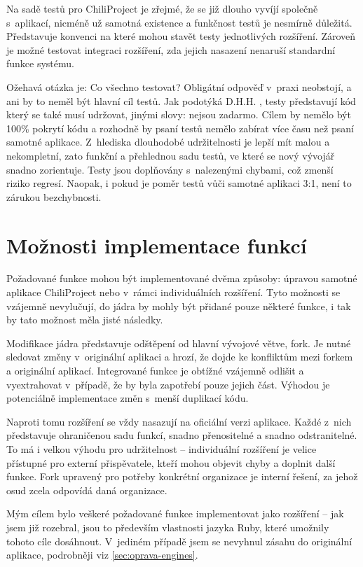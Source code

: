\documentclass[thesis=B,czech]{FITthesis}[2012/05/02]
\begin{document}
Na sadě testů pro ChiliProject je zřejmé, že se již dlouho vyvíjí
společně s~aplikací, nicméně už samotná existence a funkčnost testů je
nesmírně důležitá. Představuje konvenci na které mohou stavět testy
jednotlivých rozšíření. Zároveň je možné testovat integraci rozšíření,
zda jejich nasazení nenaruší standardní funkce systému.

Ožehavá otázka je: Co všechno testovat? Obligátní odpověď 
v~praxi neobstojí, a ani by to neměl být hlavní cíl testů. Jak podotýká
D.H.H. \citep{HanssonTestingTSA}, testy představují kód který se
také musí udržovat, jinými slovy: nejsou zadarmo. Cílem by nemělo být
100\% pokrytí kódu a rozhodně by psaní testů nemělo zabírat více času
než psaní samotné aplikace. Z~hlediska dlouhodobé udržitelnosti je lepší
mít malou a nekompletní, zato funkční a přehlednou sadu testů, ve které
se nový vývojář snadno zorientuje. Testy jsou doplňovány s~nalezenými
chybami, což zmenší riziko regresí. Naopak, i pokud je poměr testů vůči
samotné aplikaci 3:1, není to zárukou bezchybnosti.

\section{Možnosti implementace funkcí}

Požadované funkce mohou být implementované dvěma způsoby: úpravou
samotné aplikace ChiliProject nebo v~rámci individuálních rozšíření.
Tyto možnosti se vzájemně nevylučují, do jádra by mohly být přidané
pouze některé funkce, i tak by tato možnost měla jisté následky.

Modifikace jádra představuje odštěpení od hlavní vývojové větve,
\gls{fork}. Je nutné sledovat změny v~originální aplikaci a hrozí, že
dojde ke konfliktům mezi forkem a originální aplikací. Integrované
funkce je obtížné vzájemně odlišit a vyextrahovat v~případě, že by byla
zapotřebí pouze jejich část. Výhodou je potenciálně 
implementace změn s~menší duplikací kódu.

Naproti tomu rozšíření se vždy nasazují na oficiální verzi aplikace.
Každé z~nich představuje ohraničenou sadu funkcí, snadno přenositelné a
snadno odstranitelné. To má i velkou výhodu pro udržitelnost --
individuální rozšíření je velice přístupné pro externí přispěvatele,
kteří mohou objevit chyby a doplnit další funkce. Fork upravený pro
potřeby konkrétní organizace je interní řešení, za jehož osud zcela
odpovídá daná organizace.

Mým cílem bylo veškeré požadované funkce implementovat jako rozšíření --
jak jsem již rozebral, jsou to především vlastnosti jazyka Ruby, které
umožnily tohoto cíle dosáhnout. V~jediném případě jsem se nevyhnul
zásahu do originální aplikace, podrobněji viz
\ref{sec:oprava-engines}.
\end{document}
